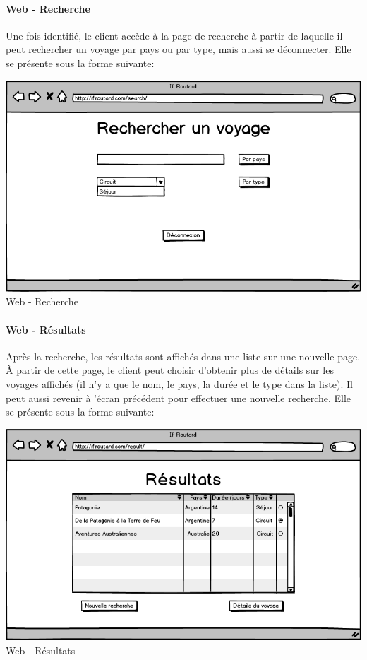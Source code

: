 \documentclass[12pt]{article}
\begin{document}
\paragraph{Web - Recherche}
Une fois identifié, le client accède à la page de recherche à partir de laquelle il peut rechercher un voyage par pays ou par type, mais aussi se déconnecter. Elle se présente sous la forme suivante:
\begin{center}
\includegraphics[scale = 0.4]{../Conception_graphique/png_Pour_CR/Web-20-Recherche.png}
\newline
Web - Recherche
\label{fig:Recherche}
\end{center}

\paragraph{Web - Résultats}
Après la recherche, les résultats sont affichés dans une liste sur une nouvelle page. À partir de cette page, le client peut choisir d'obtenir plus de détails sur les voyages affichés (il n'y a que le nom, le pays, la durée et le type dans la liste). Il peut aussi revenir à 'écran précédent pour effectuer une nouvelle recherche. Elle se présente sous la forme suivante:
\begin{center}
\includegraphics[scale = 0.4]{../Conception_graphique/png_Pour_CR/Web-30-Resultats.png}
\newline
Web - Résultats
\label{fig:Resultat}
\end{center}
\end{document}
